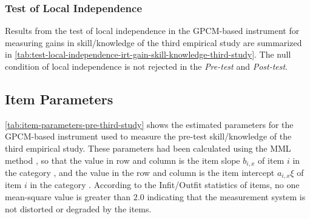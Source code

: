 \subsubsection*{Test of Local Independence}

Results from the test of local independence in the GPCM-based instrument for measuring gains in skill/knowledge of the third empirical study are summarized in \autoref{tab:test-local-independence-irt-gain-skill-knowledge-third-study}.
The null condition of local independence is not rejected in the \emph{Pre-test} and \emph{Post-test}.


\subsection{Item Parameters}

\autoref{tab:item-parameters-pre-third-study} shows the estimated parameters for the GPCM-based instrument used to measure the pre-test skill/knowledge of the third empirical study.
These parameters had been calculated using the MML method \cite{BockAitkin1981}, so that the value in row  and column  is the item slope $b_{i,x}$ of item $i$ in the category , and the value in the row  and column  is the item intercept $a_{i,x}\xi$ of item $i$ in the category .
According to the Infit/Outfit statistics of items, no one mean-square value is greater than $2.0$ indicating that the measurement system is not distorted or degraded by the items.

